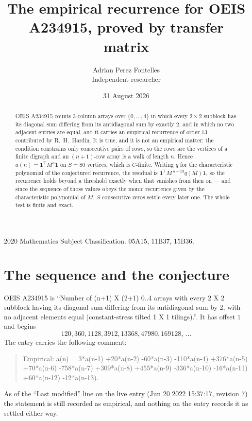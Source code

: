 \documentclass[11pt,a4paper]{article}
\title{The empirical recurrence for OEIS A234915, proved by transfer matrix}
\author{Adrian Perez Fontelles\\ \small Independent researcher}
\date{31 August 2026}
\theoremstyle{plain}
\theoremstyle{definition}
\begin{document}
\maketitle

\begin{abstract}
OEIS A234915 counts $3$-column arrays over $\{0,\dots,4\}$ in which every
$2\times2$ subblock has its diagonal sum differing from its antidiagonal sum by
exactly $2$, and in which no two adjacent entries are equal, and it
carries an empirical recurrence of order $13$ contributed by R.~H.~Hardin. It is true,
and it is not an empirical matter: the condition constrains only consecutive pairs of rows,
so the rows are the vertices of a finite digraph and an $(n+1)$-row array is a walk of
length $n$. Hence $a(n)=\mathbf{1}^{\!\top}M^{n}\mathbf{1}$ on $S=80$ vertices, which
is $C$-finite. Writing $q$ for the characteristic polynomial of the conjectured recurrence,
the residual is $\mathbf{1}^{\!\top}M^{\,n-13}q(M)\mathbf{1}$, so the recurrence
holds beyond a threshold exactly when that vanishes from then on --- and since the sequence
of those values obeys the monic recurrence given by the characteristic polynomial of $M$,
$S$ consecutive zeros settle every later one. The whole test is finite and exact.
\end{abstract}

\noindent\small 2020 Mathematics Subject Classification. 05A15, 11B37, 15B36.\normalsize

\section{The sequence and the conjecture}

OEIS A234915 is ``Number of (n+1) X (2+1) 0..4 arrays with every 2 X 2 subblock having its diagonal sum differing from its antidiagonal sum by 2, with no adjacent elements equal (constant-stress tilted 1 X 1 tilings).''. It has offset
$1$ and begins
\[
120, 360, 1128, 3912, 13368, 47980, 169128,\ \dots
\]
The entry carries the following comment:
\begin{quote}\small
Empirical: a(n) = 3*a(n-1) +20*a(n-2) -60*a(n-3) -110*a(n-4) +376*a(n-5) +70*a(n-6) -758*a(n-7) +309*a(n-8) +455*a(n-9) -336*a(n-10) -16*a(n-11) +60*a(n-12) -12*a(n-13).
\end{quote}
As of the ``Last modified'' line on the live entry (Jun 20 2022 15:37:17, revision 7) the statement is
still recorded as empirical, and nothing on the entry records it as settled either way.
\end{document}
